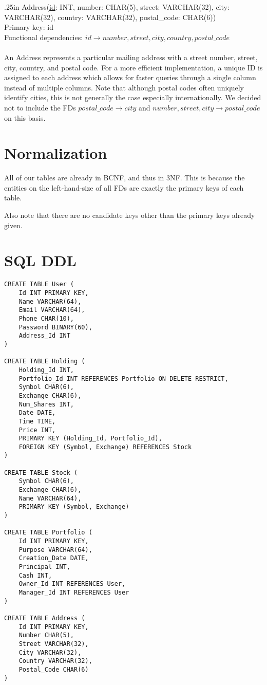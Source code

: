 \documentclass[letterpaper]{report}
\begin{document}
\hangindent .25in
{\sffamily Address(\underline{id}: INT, number: CHAR(5), street: VARCHAR(32), city: VARCHAR(32), country: VARCHAR(32), postal\_code: CHAR(6))}\\
Primary key: {\sffamily id} \\
Functional dependencies: $id \to number, street, city, country, postal\_code$ \\\\
An {\sffamily Address} represents a particular mailing address with a street number, street, city, country, and postal code. For a more efficient implementation, a unique ID is assigned to each address which allows for faster queries through a single column instead of multiple columns. Note that although postal codes often uniquely identify cities, this is not generally the case especially internationally. We decided not to include the FDs $postal\_code \to city$ and $number, street, city \to postal\_code$ on this basis.

\section*{Normalization}
All of our tables are already in BCNF, and thus in 3NF. This is because the entities on the left-hand-size of all FDs are exactly the primary keys of each table.

Also note that there are no candidate keys other than the primary keys already given.

\section*{SQL DDL}
\begin{verbatim}
CREATE TABLE User (
    Id INT PRIMARY KEY,
    Name VARCHAR(64),
    Email VARCHAR(64),
    Phone CHAR(10),
    Password BINARY(60),
    Address_Id INT
)

CREATE TABLE Holding (
    Holding_Id INT,
    Portfolio_Id INT REFERENCES Portfolio ON DELETE RESTRICT,
    Symbol CHAR(6),
    Exchange CHAR(6),
    Num_Shares INT,
    Date DATE,
    Time TIME,
    Price INT,
    PRIMARY KEY (Holding_Id, Portfolio_Id),
    FOREIGN KEY (Symbol, Exchange) REFERENCES Stock
)

CREATE TABLE Stock (
    Symbol CHAR(6),
    Exchange CHAR(6),
    Name VARCHAR(64),
    PRIMARY KEY (Symbol, Exchange)
)

CREATE TABLE Portfolio (
    Id INT PRIMARY KEY,
    Purpose VARCHAR(64),
    Creation_Date DATE,
    Principal INT,
    Cash INT,
    Owner_Id INT REFERENCES User,
    Manager_Id INT REFERENCES User
)

CREATE TABLE Address (
    Id INT PRIMARY KEY,
    Number CHAR(5),
    Street VARCHAR(32),
    City VARCHAR(32),
    Country VARCHAR(32),
    Postal_Code CHAR(6)
)
\end{verbatim}
\end{document}
